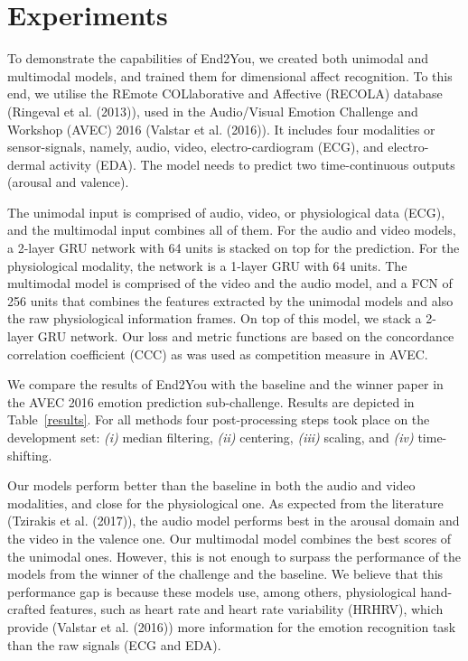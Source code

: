 \documentclass[twoside,11pt]{article}
\begin{document}
\section{Experiments}

To demonstrate the capabilities of End2You, we created both unimodal and multimodal models, and trained them for dimensional affect recognition. To this end, we utilise the REmote COLlaborative and  Affective (RECOLA) database (Ringeval et al. (2013)), used in the Audio/Visual Emotion Challenge and Workshop (AVEC) 2016 (Valstar et al. (2016)). It includes four modalities or sensor-signals, namely, audio,  video,  electro-cardiogram  (ECG),  and  electro-dermal  activity  (EDA). The model needs to predict two time-continuous outputs (arousal and valence).

The unimodal input is comprised of audio, video, or physiological data (ECG), and the multimodal input combines all of them. For the audio and video models, a 2-layer GRU network with 64 units is stacked on top for the prediction. For the physiological modality, the network is a 1-layer GRU with 64 units. The multimodal model is comprised of the video and the audio model, and a FCN of 256 units that combines the features extracted by the unimodal models and also the raw physiological information frames. On top of this model, we stack a 2-layer GRU network. Our loss and metric functions are based on the concordance correlation coefficient (CCC) as was used as competition measure in AVEC.

We compare the results of End2You with the baseline and the winner paper in the AVEC 2016 emotion prediction sub-challenge. Results are depicted in Table~\ref{results}. For all methods four post-processing steps took place on the development set: \textit{(i)} median filtering, \textit{(ii)} centering, \textit{(iii)} scaling, and \textit{(iv)} time-shifting.

Our models perform better than the baseline in both the audio and video modalities, and close for the physiological one. As expected from the literature (Tzirakis et al. (2017)), 
the audio model performs best in the arousal domain and the video in the valence one. Our multimodal model combines the best scores of the unimodal ones. However, this is not enough to surpass the performance of the models from the winner of the challenge and the baseline. We believe that this performance gap is because these models use, among others, physiological hand-crafted features, such as heart rate and heart rate variability (HRHRV), which provide (Valstar et al. (2016))  more information for the emotion recognition task than the raw signals (ECG and EDA).
\end{document}
